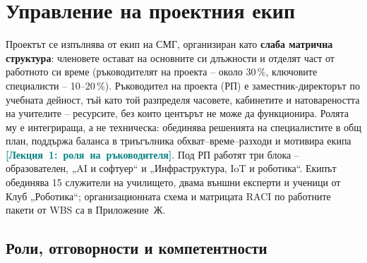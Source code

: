 \documentclass[11pt,a4paper]{article}
\newcommand{\lecturetag}[1]{\textcolor{teal}{\small\bfseries[#1]}}
\begin{document}
\clearpage%
\section{Управление на проектния екип}

Проектът се изпълнява от екип на СМГ, организиран като \textbf{слаба матрична структура}: членовете остават на основните си длъжности и отделят част от работното си време (ръководителят на проекта – около 30\,\%, ключовите специалисти – 10–20\,\%). Ръководител на проекта (РП) е заместник-директорът по учебната дейност, тъй като той разпределя часовете, кабинетите и натовареността на учителите – ресурсите, без които центърът не може да функционира. Ролята му е интегрираща, а не техническа: обединява решенията на специалистите в общ план, поддържа баланса в триъгълника обхват–време–разходи и мотивира екипа \mbox{\lecturetag{Лекция 1: роля на ръководителя}}. Под РП работят три блока – образователен, „AI и софтуер“ и „Инфраструктура, IoT и роботика“. Екипът обединява 15 служители на училището, двама външни експерти и ученици от Клуб „Роботика“; организационната схема и матрицата RACI по работните пакети от WBS са в Приложение~Ж.

\subsection{Роли, отговорности и компетентности}
\end{document}
